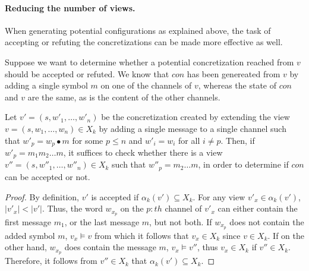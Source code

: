 \paragraph{Reducing the number of views.}
When generating potential configurations as explained above, the task of accepting or refuting the concretizations can be made more effective as well.

Suppose we want to determine whether a potential concretization  reached from $v$ should be accepted or refuted. We know that $con$ has been genereated from $v$ by adding a single symbol $m$ on one of the channels of $v$, whereas the state of $con$ and $v$ are the same, as is the content of the other channels.

\begin{lemma}
Let $v' = (s, w'_1, \ldots, w'_n)$ be the concretization created by extending the view $v = (s, w_1, \ldots, w_n) \in X_k$ by adding a single message to a single channel such that $w'_p = w_p \bullet m$ for some $p\leq n$ and $w'_i = w_i$ for all $i \neq p$. Then, if $w'_p = m_1 m_2 \ldots m$, it suffices to check whether there is a view $v'' = (s, w''_1, \ldots, w''_n) \in X_k$ such that $w''_p = m_2\ldots m$, in order to determine if $con$ can be accepted or not.
\end{lemma}

\begin{proof}
By definition, $v'$ is accepted if $\alpha_k(v') \subseteq X_k$. For any view $v'_x \in \alpha_k(v')$, $|v'_x| < |v'|$. Thus, the word $w_{x_p}$ on the $p:th$ channel of $v'_x$ can either contain the first message $m_1$, or the last message $m$, but not both. If $w_{x_p}$ does not contain the added symbol $m$, $v_x \models v$ from which it follows that $v_x \in X_k$ since $v \in X_k$. If on the other hand, $w_{x_p}$ does contain the message $m$, $v_x \models v''$, thus $v_x \in X_k$ if $v'' \in X_k$. Therefore, it follows from $v'' \in X_k$ that $\alpha_k(v') \subseteq X_k$.



\end{proof}

